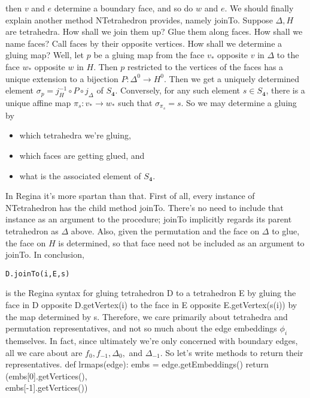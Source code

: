 \documentclass[10pt,twocolumn]{article}%
\theoremstyle{definition}
\begin{document}
then $v$ and $e$ determine a boundary face, and so
do $w$ and $e$.
\nwenddocs{}\nwdocspar
We should
finally explain another method 
{\Tt{}NTetrahedron\nwendquote} provides, namely {\Tt{}joinTo\nwendquote}.
Suppose $\Delta,H$ are tetrahedra.
How shall we join them up? Glue them along
faces. How shall we name faces? Call faces
by their opposite vertices. How shall we
determine a gluing map? Well, let $p$
be a gluing map from the face $v_\ast$ opposite $v$ in $\Delta$
to the face $w_\ast$ opposite $w$ in $H$. Then $p$
restricted to the vertices of the 
faces has a unique extension to a bijection
$P:\Delta^0 \to H^0$. Then we get a uniquely determined
element $\sigma_p = j_H^{-1} \circ P \circ j_\Delta$
of $S_{\mathbf{4}}$. 
\nwenddocs{}\nwdocspar
Conversely, for any such element
$s \in S_{\mathbf{4}}$, there is a unique affine
map $\pi_s: v_\ast \to w_\ast$ such that
$\sigma_{\pi_s} = s$. 
\nwenddocs{}\nwdocspar
So we may determine a gluing by
\begin{itemize}
\item which tetrahedra we're gluing,
\item which faces are getting glued, and
\item what is the associated element of $S_{\mathbf{4}}$.
\end{itemize}
\nwenddocs{}\nwdocspar
In {\Tt{}Regina\nwendquote} it's more spartan than that. First of all,
every instance of {\Tt{}NTetrahedron\nwendquote} has the child method {\Tt{}joinTo\nwendquote}.
There's no need to include that instance as an argument
to the procedure; {\Tt{}joinTo\nwendquote} implicitly regards its parent tetrahedron
as $\Delta$ above. Also, given the permutation and the
face on $\Delta$ to glue, the face on $H$ is determined, so
that face need not be included as an argument to {\Tt{}joinTo\nwendquote}. 
\nwenddocs{}\nwdocspar
In conclusion, 
\begin{verbatim}
D.joinTo(i,E,s)
\end{verbatim}
is the {\Tt{}Regina\nwendquote} syntax for gluing 
tetrahedron {\Tt{}D\nwendquote} to a tetrahedron {\Tt{}E\nwendquote}
by gluing the face in {\Tt{}D\nwendquote} opposite {\Tt{}D.getVertex(i)\nwendquote}
to the face in {\Tt{}E\nwendquote} opposite {\Tt{}E.getVertex(s(i))\nwendquote}
by the map determined by {\Tt{}s\nwendquote}.
\nwenddocs{}\nwdocspar
Therefore, we care primarily about
tetrahedra and permutation representatives, and 
not so much about the edge embeddings
$\phi_i$ themselves. In fact, since
ultimately we're only concerned with boundary edges,
all we care about are $f_0, f_{-1}, \Delta_0,$ 
and $\Delta_{-1}$. So let's write methods 
to return their representatives.
\nwenddocs{}\endmoddef\nwstartdeflinemarkup\nwenddeflinemarkup
def lrmaps(edge):
  embs = edge.getEmbeddings()
  return (embs[0].getVertices(),\\
          embs[-1].getVertices())
\end{document}
